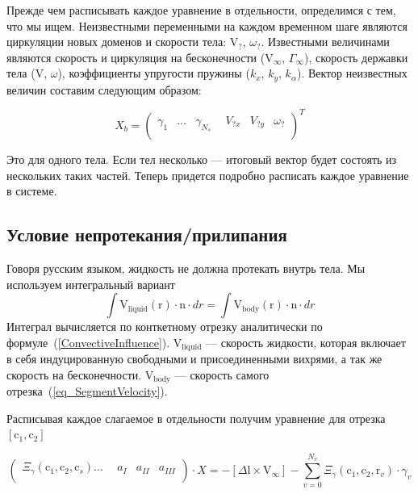 \documentclass[14pt]{extreport}
\newcommand{\br}[1]{\boldsymbol{\mathrm{#1}}}
\renewcommand{\vec}[1]{\br{#1}}
\begin{document}
Прежде чем расписывать каждое уравнение в отдельности, определимся с тем, что мы ищем. Неизвестными переменными на каждом временном шаге являются циркуляции новых доменов и скорости тела: $\vec V_?$, $\omega_?$. Известными величинами являются скорость и циркуляция на бесконечности ($\vec V_\infty$, $\Gamma_\infty$), скорость державки тела ($\vec V$, $\omega$), коэффициенты упругости пружины ($k_x$, $k_y$, $k_\alpha$). Вектор неизвестных величин составим следующим образом:

\begin{equation}
\label{eq_5_3_1}
X_b =
\left(\begin{matrix}
\gamma_1 & \dotsc & \gamma_{N_s}& ~~V_{?x}& V_{?y}& \omega_?\\
\end{matrix}\right)^T
\end{equation}

Это для одного тела. Если тел несколько --- итоговый вектор будет состоять из нескольких таких частей. Теперь придется подробно расписать каждое уравнение в системе. 

\subsection{Условие непротекания/прилипания}

Говоря русским языком, жидкость не должна протекать внутрь тела. Мы используем интегральный вариант
\begin{equation*}
\int{\vec V_\text{liquid}(\vec r) \cdot \vec n \cdot dr} = \int {\vec V_\text{body}(\vec r) \cdot \vec n \cdot dr}
\end{equation*}
Интеграл вычисляется по конткетному отрезку аналитически по формуле~(\ref{ConvectiveInfluence}). $\br V_\text{liquid}$ --- скорость жидкости, которая включает в себя индуцированную свободными и присоединенными вихрями, а так же скорость на бесконечности. $\br V_\text{body}$ --- скорость самого отрезка~(\ref{eq_SegmentVelocity}).

Расписывая каждое слагаемое в отдельности получим уравнение для отрезка $[\vec c_1, \vec c_2]$

\begin{equation}
\label{eq_noslip}
\left(\begin{matrix}
\Xi_\gamma(\vec c_1, \vec c_2, \vec c_s)\dotsc& ~~a_{I}& a_{II}& a_{III}\\
\end{matrix}\right)
\cdot X
=
-[\Delta \vec l \times \vec V_\infty] - \sum\limits_{v=0}^{N_v} \Xi_\gamma (\vec c_1, \vec c_2, \vec r_v) \cdot \gamma_v
\end{equation}
\end{document}
